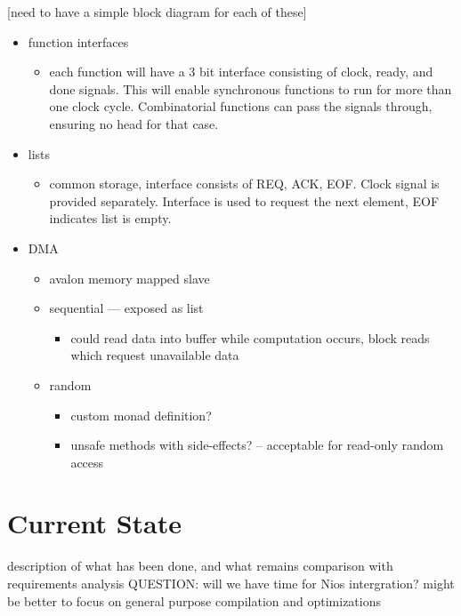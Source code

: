 \documentclass[english,onecolumn]{article}
\begin{document}
{[}need to have a simple block diagram for each of these{]}
\begin{itemize}
\item function interfaces

\begin{itemize}
\item each function will have a 3 bit interface consisting of clock, ready,
and done signals. This will enable synchronous functions to run for
more than one clock cycle. Combinatorial functions can pass the signals
through, ensuring no head for that case.
\end{itemize}
\item lists

\begin{itemize}
\item common storage, interface consists of REQ, ACK, EOF. Clock signal
is provided separately. Interface is used to request the next element,
EOF indicates list is empty.
\end{itemize}
\item DMA

\begin{itemize}
\item avalon memory mapped slave
\item sequential --- exposed as list

\begin{itemize}
\item could read data into buffer while computation occurs, block reads
which request unavailable data
\end{itemize}
\item random

\begin{itemize}
\item custom monad definition?
\item unsafe methods with side-effects? -- acceptable for read-only random
access
\end{itemize}
\end{itemize}
\end{itemize}

\section{Current State}
description of what has been done, and what remains
comparison with requirements analysis
QUESTION: will we have time for Nios intergration? might be better to focus on general purpose compilation and optimizations

\end{document}
